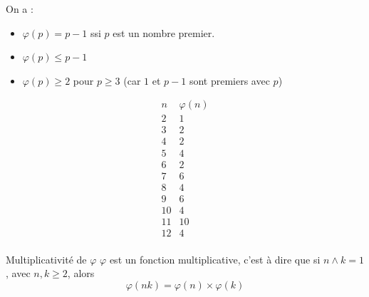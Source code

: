 \begin{remarque}
    On a : 
    \begin{itemize}
        \item $\varphi(p) = p - 1$ ssi $p$ est un nombre premier.
        \item $\varphi(p) \leqslant p - 1$
        \item $\varphi(p) \geqslant 2$ pour $p \geqslant 3$ (car $1$ et $p - 1$ sont premiers avec $p$)
    \end{itemize}
\end{remarque}

\[
    \begin{array}{c|c}
        n & \varphi(n) \\
        \hline
        2 & 1 \\
        3 & 2 \\
        4 & 2 \\
        5 & 4 \\
        6 & 2 \\
        7 & 6 \\
        8 & 4 \\
        9 & 6 \\
        10 & 4 \\
        11 & 10 \\
        12 & 4 \\
    \end{array}
\]

\begin{theoreme}{Multiplicativité de $\varphi$}{}
    $\varphi$ est un fonction multiplicative, c'est à dire que 
    si $n \wedge k = 1$, avec $n, k \geqslant 2$, alors
    \[\varphi(nk) = \varphi(n) \times \varphi(k)\]
\end{theoreme}


